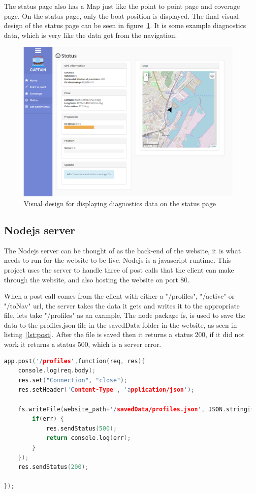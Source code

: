 The status page also has a Map just like the point to point page and coverage page. On the status page, only the boat position is displayed. The final visual design of the status page can be seen in figure~\ref{fig:statuspage}. It is some example diagnostics data, which is very like the data got from the navigation.

\begin{figure}[H]
\centering
\includegraphics[width=0.7\linewidth]{Images/Implementation/status_page}
\caption{Visual design for displaying diagnostics data on the status page}
\label{fig:statuspage}
\end{figure}


\subsection{Nodejs server}
\label{sec:nodejs_server}
The Nodejs server can be thought of as the back-end of the website, it is what needs to run for the website to be live. Nodejs is a javascript runtime\cite{nodejs}. This project uses the server to handle three of post calls that the client can make through the website, and also hosting the website on port 80. 

When a post call comes from the client with either a "/profiles", "/active" or "/toNav" url, the server takes the data it gets and writes it to the appropriate file, lets take "/profiles" as an example, The node package fs, is used to save the data to the profiles.json file in the savedData folder in the website, as seen in listing~\ref{lst:post}. After the file is saved then it returns a status 200, if it did not work it returns a status 500, which is a server error.

\begin{lstlisting}[caption = {Handeling a POST call to url "/profiles"}, captionpos=b, label={lst:post}, language=C++,firstnumber=1]
app.post('/profiles',function(req, res){
	console.log(req.body);
	res.set("Connection", "close");
	res.setHeader('Content-Type', 'application/json');

	fs.writeFile(website_path+'/savedData/profiles.json', JSON.stringify(req.body), function(err) {
	    if(err) {
			res.sendStatus(500);
	        return console.log(err);
	    }
	});
	res.sendStatus(200);

});
\end{lstlisting}

